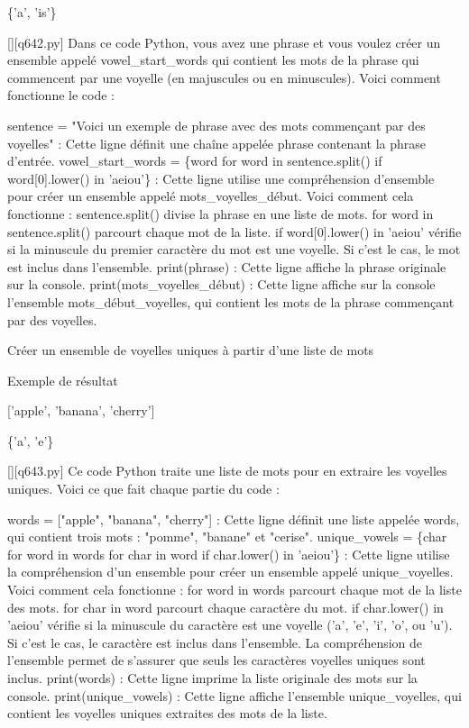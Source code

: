 \{'a', 'is'\}
        \par
        \begin{solution}
            \renewcommand{\nomfichier}{q642.py}
            \pythonfile{\chemincode \nomfichier}[][\nomfichier]
            Dans ce code Python, vous avez une phrase et vous voulez créer un ensemble appelé vowel\_start\_words qui contient les mots de la phrase qui commencent par une voyelle (en majuscules ou en minuscules). Voici comment fonctionne le code :

    sentence = "Voici un exemple de phrase avec des mots commençant par des voyelles" : Cette ligne définit une chaîne appelée phrase contenant la phrase d'entrée.
    vowel\_start\_words = \{word for word in sentence.split() if word[0].lower() in 'aeiou'\} : Cette ligne utilise une compréhension d'ensemble pour créer un ensemble appelé mots\_voyelles\_début. Voici comment cela fonctionne :
        sentence.split() divise la phrase en une liste de mots.
        for word in sentence.split() parcourt chaque mot de la liste.
        if word[0].lower() in 'aeiou' vérifie si la minuscule du premier caractère du mot est une voyelle. Si c'est le cas, le mot est inclus dans l'ensemble.
    print(phrase) : Cette ligne affiche la phrase originale sur la console.
    print(mots\_voyelles\_début) : Cette ligne affiche sur la console l'ensemble mots\_début\_voyelles, qui contient les mots de la phrase commençant par des voyelles.
        \end{solution}
        

        \question
        Créer un ensemble de voyelles uniques à partir d'une liste de mots

Exemple de résultat

['apple', 'banana', 'cherry']

\{'a', 'e'\}
        \par
        \begin{solution}
            \renewcommand{\nomfichier}{q643.py}
            \pythonfile{\chemincode \nomfichier}[][\nomfichier]
            Ce code Python traite une liste de mots pour en extraire les voyelles uniques. Voici ce que fait chaque partie du code :

    words = ["apple", "banana", "cherry"] : Cette ligne définit une liste appelée words, qui contient trois mots : "pomme", "banane" et "cerise".
    unique\_vowels = \{char for word in words for char in word if char.lower() in 'aeiou'\} : Cette ligne utilise la compréhension d'un ensemble pour créer un ensemble appelé unique\_voyelles. Voici comment cela fonctionne :
        for word in words parcourt chaque mot de la liste des mots.
        for char in word parcourt chaque caractère du mot.
        if char.lower() in 'aeiou' vérifie si la minuscule du caractère est une voyelle ('a', 'e', 'i', 'o', ou 'u'). Si c'est le cas, le caractère est inclus dans l'ensemble. La compréhension de l'ensemble permet de s'assurer que seuls les caractères voyelles uniques sont inclus.
    print(words) : Cette ligne imprime la liste originale des mots sur la console.
    print(unique\_vowels) : Cette ligne affiche l'ensemble unique\_voyelles, qui contient les voyelles uniques extraites des mots de la liste.
        \end{solution}
        

